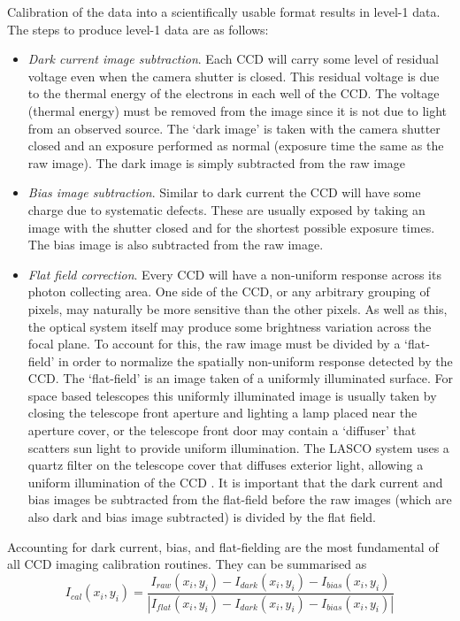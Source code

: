 Calibration of the data into a scientifically usable format results in level-1 data. The steps to produce level-1 data are as follows:
\begin{itemize}
\item \emph{Dark current image subtraction}. Each CCD will carry some level of residual voltage even when the camera shutter is closed. This residual voltage is due to the thermal energy of the electrons in each well of the CCD. The voltage (thermal energy) must be removed from the image since it is not due to light from an observed source. The `dark image' is taken with the camera shutter closed and an exposure performed as normal (exposure time the same as the raw image). The dark image is simply subtracted from the raw image
%
\item \emph{Bias image subtraction}. Similar to dark current the CCD will have some charge due to systematic defects. These are usually exposed by taking an image with the shutter closed and for the shortest possible exposure times. The bias image is also subtracted from the raw image.
%
\item \emph{Flat field correction}. Every CCD will have a non-uniform response across its photon collecting area. One side of the CCD, or any arbitrary grouping of pixels, may naturally be more sensitive than the other pixels. As well as this, the optical system itself may produce some brightness variation across the focal plane. To account for this, the raw image must be divided by a `flat-field' in order to normalize the spatially non-uniform response detected by the CCD. The `flat-field' is an image taken of a uniformly illuminated surface. For space based telescopes this uniformly illuminated image is usually taken by closing the telescope front aperture and lighting a lamp placed near the aperture cover, or the telescope front door may contain a `diffuser' that scatters sun light to provide uniform illumination. The LASCO system uses a quartz filter on the telescope cover that diffuses exterior light, allowing a uniform illumination of the CCD \citep{bru95}. It is important that the dark current and bias images be subtracted from the flat-field before the raw images (which are also dark and bias image subtracted) is divided by the flat field.
%
\end{itemize}
Accounting for dark current, bias, and flat-fielding are the most fundamental of all CCD imaging calibration routines. They can be summarised as
\begin{equation}
I_{cal}(x_i, y_i) = \frac{ I_{raw}(x_i, y_i)  - I_{dark}(x_i, y_i) - I_{bias}(x_i, y_i)  }{ | I_{flat}(x_i, y_i) - I_{dark}(x_i, y_i) - I_{bias}(x_i, y_i)| }
\end{equation}
